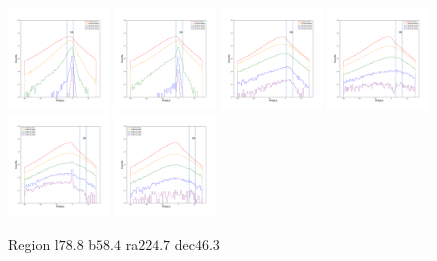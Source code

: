 \documentclass[12pt,prd]{article}
\begin{document}
\begin{figure}[h!]
\includegraphics[width=0.24\textwidth]{../figures/scanning_plotsgaiascan_l78_8_b58_4_ra224_7_dec46_3_npy_12.pdf}
\includegraphics[width=0.24\textwidth]{../figures/scanning_plotsgaiascan_l78_8_b58_4_ra224_7_dec46_3_npy_13.pdf}
\includegraphics[width=0.24\textwidth]{../figures/scanning_plotsgaiascan_l78_8_b58_4_ra224_7_dec46_3_npy_14.pdf}
\includegraphics[width=0.24\textwidth]{../figures/scanning_plotsgaiascan_l78_8_b58_4_ra224_7_dec46_3_npy_15.pdf}
\includegraphics[width=0.24\textwidth]{../figures/scanning_plotsgaiascan_l78_8_b58_4_ra224_7_dec46_3_npy_16.pdf}
\includegraphics[width=0.24\textwidth]{../figures/scanning_plotsgaiascan_l78_8_b58_4_ra224_7_dec46_3_npy_17.pdf}
\caption{Region l$78.8$ b$58.4$ ra$224.7$ dec$46.3$}
\end{figure}
\end{document}
